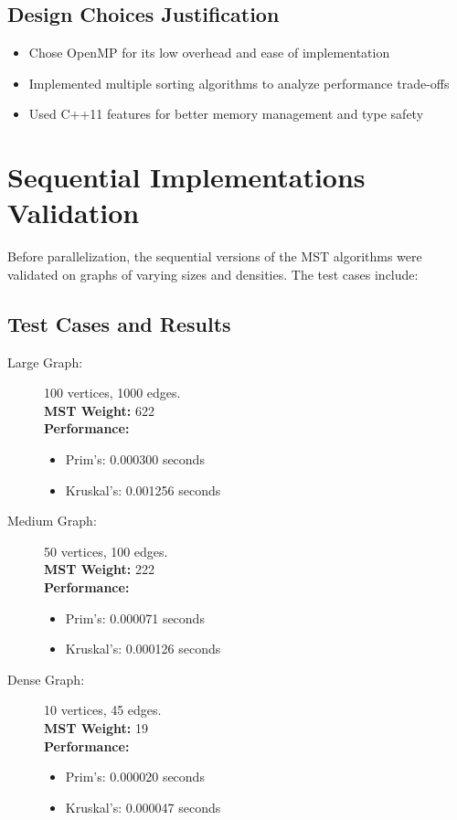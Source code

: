 \documentclass[11pt]{article}
\begin{document}
\subsection{Design Choices Justification}
\begin{itemize}
    \item Chose OpenMP for its low overhead and ease of implementation
    \item Implemented multiple sorting algorithms to analyze performance trade-offs
    \item Used C++11 features for better memory management and type safety
\end{itemize}

\section{Sequential Implementations Validation}
Before parallelization, the sequential versions of the MST algorithms were validated on graphs of varying sizes and densities. The test cases include:

\subsection{Test Cases and Results}
\begin{description}
    \item[Large Graph:] 100 vertices, 1000 edges. \\
    \textbf{MST Weight:} 622 \\
    \textbf{Performance:}
    \begin{itemize}
        \item Prim's: 0.000300 seconds
        \item Kruskal's: 0.001256 seconds
    \end{itemize}
    
    \item[Medium Graph:] 50 vertices, 100 edges. \\
    \textbf{MST Weight:} 222 \\
    \textbf{Performance:}
    \begin{itemize}
        \item Prim's: 0.000071 seconds
        \item Kruskal's: 0.000126 seconds
    \end{itemize}
    
    \item[Dense Graph:] 10 vertices, 45 edges. \\
    \textbf{MST Weight:} 19 \\
    \textbf{Performance:}
    \begin{itemize}
        \item Prim's: 0.000020 seconds
        \item Kruskal's: 0.000047 seconds
    \end{itemize}
\end{description}
\end{document}
